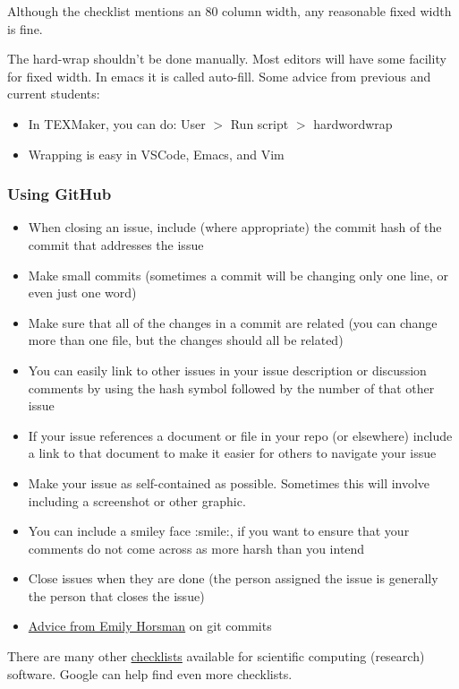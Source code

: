 \documentclass[12pt]{article}
\begin{document}
Although the checklist mentions an 80 column width, any reasonable fixed width is fine.

The hard-wrap shouldn't be done manually. Most editors will have some facility for fixed width. In
emacs it is called auto-fill. Some advice from previous and current students:

\begin{itemize}
	\item In TEXMaker, you can do: User $>$ Run script $>$ hardwordwrap
	\item Wrapping is easy in VSCode, Emacs, and Vim
\end{itemize}

\subsubsection*{Using GitHub}

\begin{itemize}
	\item When closing an issue, include (where appropriate) the commit hash of the commit that addresses the
	      issue
	\item Make small commits (sometimes a commit will be changing only one line, or even just one word)
	\item Make sure that all of the changes in a commit are related (you can change more than one file, but
	      the changes should all be related)
	\item You can easily link to other issues in your issue description or discussion comments by using the
	      hash symbol followed by the number of that other issue
	\item If your issue references a document or file in your repo (or elsewhere) include a link to that
	      document to make it easier for others to navigate your issue
	\item Make your issue as self-contained as possible. Sometimes this will involve including a screenshot
	      or other graphic.
	\item You can include a smiley face :smile:, if you want to ensure that your comments do not come across
	      as more harsh than you intend
	\item Close issues when they are done (the person assigned the issue is generally the person that closes
	      the issue)
	\item \href{https://gitlab.cas.mcmaster.ca/smiths/se2aa4_cs2me3/-/blob/master/FAQ/GitAdvice.txt} {Advice
		      from Emily Horsman} on git commits
\end{itemize}

There are many other
\href{https://gitlab.cas.mcmaster.ca/SEforSC/se4sc/-/wikis/Advice-and-Checklists-for-Repos-(including-a-list-of-recommended-artifacts)}{checklists}
available for scientific computing (research) software. Google can help find even more checklists.
\end{document}
